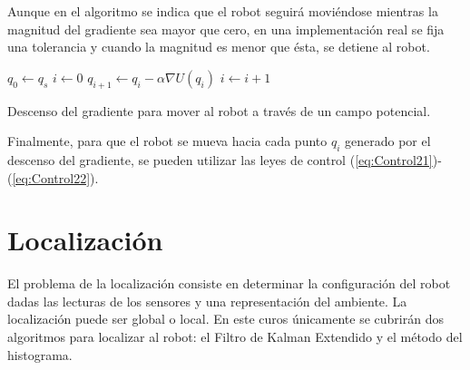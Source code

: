 Aunque en el algoritmo se indica que el robot seguirá moviéndose mientras la magnitud del gradiente sea mayor que cero, en una implementación real se fija una tolerancia y cuando la magnitud es menor que ésta, se detiene al robot. 
\begin{algorithm}
	\DontPrintSemicolon
	$q_0 \leftarrow q_s$\;
	$i \leftarrow 0$\;
	{
		$q_{i+1} \leftarrow q_i - \alpha\nabla U(q_i)$\;
		$i \leftarrow i + 1$
	}
	\caption{Descenso del gradiente para mover al robot a través de un campo potencial.}
	\label{alg:PotFields}
\end{algorithm}

Finalmente, para que el robot se mueva hacia cada punto $q_i$ generado por el descenso del gradiente, se pueden utilizar las leyes de control (\ref{eq:Control21})-(\ref{eq:Control22}).





\section{Localización}
El problema de la localización consiste en determinar la configuración del robot dadas las lecturas de los sensores y una representación del ambiente. La localización puede ser global o local. En este curos únicamente se cubrirán dos algoritmos para localizar al robot: el Filtro de Kalman Extendido y el método del histograma. 

